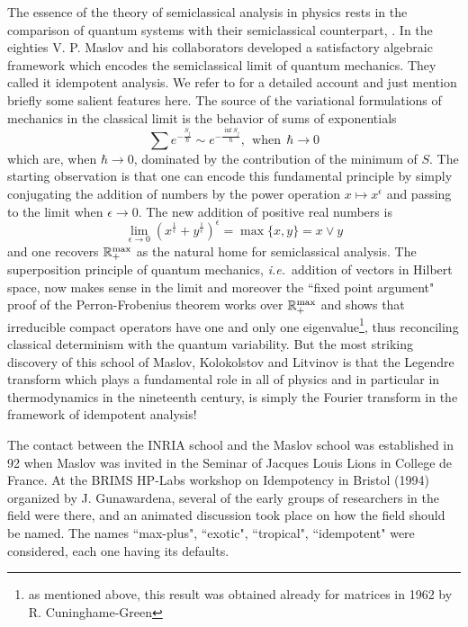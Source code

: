 \documentclass[12pt]{article}
\def\R{{\mathbb R}}
\newcommand{\ie}{{\it i.e.\/}\ }
\def\rmax{\R_+^{\rm max}}
\begin{document}
The essence of the theory of semiclassical analysis in physics rests in the comparison of quantum systems with their semiclassical counterpart, \cite{GS,Gutz,Gutz1,Maslov1,Berry}. In the eighties  V. P. Maslov and his collaborators developed a satisfactory algebraic framework which encodes the semiclassical limit of quantum mechanics. They called it idempotent analysis. We refer to  \cite{Maslov,Lit} for a detailed account and just mention briefly some salient features here.  The source of the variational formulations of  mechanics in the classical limit  is the behavior of  sums of exponentials
 $$
\sum e^{-\frac{ S_j}{ \hbar}} \sim e^{-\frac{ \inf S_j}{ \hbar}}, \  \ \text{when}\ \ \hbar\to 0
$$ 
which are, when $\hbar\to 0$, dominated by the contribution of the minimum of $S$. The starting observation is that one can encode this fundamental principle by simply conjugating the addition of numbers by the power operation $x\mapsto x^\epsilon$ and passing to the limit when $\epsilon\to 0$.   The new addition of positive real numbers is 
$$
\lim_{\epsilon \to 0}\left(x^{\frac 1\epsilon}+y^{\frac 1\epsilon}\right)^\epsilon=\max \{x,y\}=x\vee y
$$
and one recovers $\rmax$ as the natural home for semiclassical analysis.
The  superposition principle of quantum mechanics, \ie addition of vectors in Hilbert space,  now makes sense  in the limit and moreover the ``fixed point argument" proof of the Perron-Frobenius theorem works over $\rmax$ and shows that irreducible compact operators have one and only one eigenvalue\footnote{as mentioned above, this result was obtained already for matrices in 1962 by R. Cuninghame-Green}, thus reconciling classical determinism with the quantum variability. But the most striking discovery of this school of Maslov, Kolokolstov and Litvinov \cite{Maslov,Lit} is that the Legendre transform which plays a fundamental role in all of physics and in particular in 
 thermodynamics in the nineteenth century, is simply the Fourier transform  in the framework of  idempotent analysis!

  The contact between the INRIA school and the Maslov school was established in 92 when Maslov was invited  in the Seminar of Jacques Louis Lions in College de France. At the BRIMS HP-Labs workshop on Idempotency in Bristol (1994) organized by J. Gunawardena, several of the early groups of researchers in the field were there, and an animated discussion took place on how the field should be named.
The names ``max-plus", ``exotic", ``tropical", ``idempotent" were considered, each one having its defaults.
\end{document}
